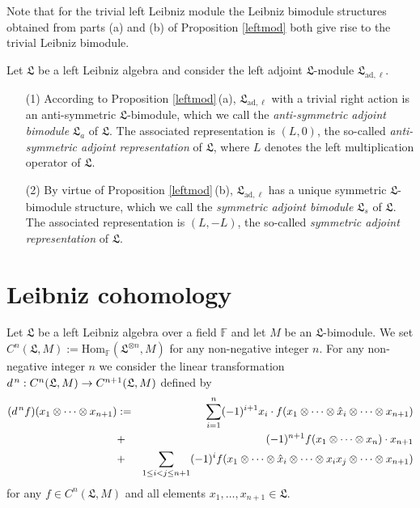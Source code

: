 \documentclass{amsart}
\numberwithin{equation}{section}
\newcommand{\ad}{\mathrm{ad}}
\newcommand{\Hom}{\mathrm{Hom}}
\newcommand{\F}{\mathbb{F}}
\newcommand{\lf}{\mathfrak{L}}
\begin{document}
Note that for the trivial left Leibniz module the Leibniz bimodule structures obtained from parts (a)
and (b) of Proposition \ref{leftmod} both give rise to the trivial Leibniz bimodule.
\vspace{.2cm}

 Let $\lf$ be a left Leibniz algebra and consider the left adjoint $\lf$-module
$\lf_{\ad,\ell}$.
\begin{enumerate}
\item[(1)] According to Proposition \ref{leftmod}\,(a), $\lf_{\ad,\ell}$ with a trivial right action is an
                anti-symmetric $\lf$-bimodule, which we call the {\em anti-symmetric adjoint bimodule\/}
                $\lf_a$ of $\lf$. The associated representation is $(L,0)$, the so-called {\em anti-symmetric
                adjoint representation\/} of $\lf$, where $L$ denotes the left multiplication operator of $\lf$.
\item[(2)] By virtue of Proposition \ref{leftmod}\,(b), $\lf_{\ad,\ell}$ has a unique symmetric
                $\lf$-bimodule structure, which we call the {\em symmetric adjoint bimodule\/} $\lf_s$ of
                $\lf$. The associated representation is $(L,-L)$, the so-called {\em symmetric adjoint
                representation\/} of $\lf$.
\end{enumerate}
\vspace{-.1cm}


\section{Leibniz cohomology}


Let $\lf$ be a left Leibniz algebra over a field $\F$ and let $M$ be an $\lf$-bimodule. We
set $C^n(\lf,M):=\Hom_\F(\lf^{\otimes n},M)$ for any non-negative integer $n$. For any
non-negative integer $n$ we consider the linear transformation $d\hspace{.4mm}^n:C^n
(\lf,M)\to C^{n+1}(\lf,M)$ defined by
\begin{eqnarray*}
(d\hspace{.4mm}^nf)(x_1\otimes\cdots\otimes x_{n+1}) & := & \sum_{i=1}^n(-1)^{i+1}x_i
\cdot f(x_1\otimes\cdots\otimes\hat{x}_i\otimes\cdots\otimes x_{n+1})\\
& + & (-1)^{n+1}f(x_1\otimes\cdots\otimes x_n)\cdot x_{n+1}\\
& + & \sum_{1\le i<j\le n+1}(-1)^if(x_1\otimes\cdots\otimes\hat{x}_i\otimes\cdots\otimes x_i
x_j\otimes\cdots\otimes x_{n+1})
\end{eqnarray*}
for any $f\in C^n(\lf,M)$ and all elements $x_1,\dots,x_{n+1}\in\lf$.
\end{document}
